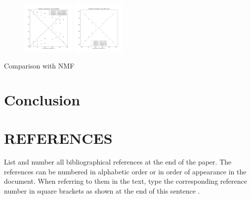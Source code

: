 \documentclass{article}
\begin{document}
\begin{figure}
  \includegraphics[width=0.23\textwidth]{figures/DNN_pred_conc_prob.png}
  \includegraphics[width=0.23\textwidth]{figures/nmf_pred_conc.png}
\end{figure}

Comparison with NMF

\section{Conclusion}
\label{ssec:conclusion}



\vfill
\pagebreak



\section{REFERENCES}
\label{sec:ref}

List and number all bibliographical references at the end of the paper.  The references can be numbered in alphabetic order or in order of appearance in the document.  When referring to them in the text, type the corresponding reference number in square brackets as shown at the end of this sentence .



\end{document}
